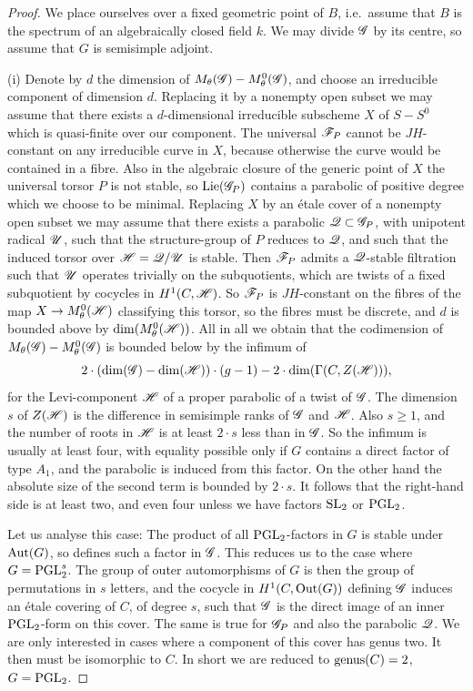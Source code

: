 \documentclass[12pt,english]{smfart}
\theoremstyle{plain} \newtheorem{innerthm}{Theorem} \newtheorem{innerlem}{Lemma} \newtheorem{innerprop}{Proposition} \newtheorem{innercor}{Corollary} \theoremstyle{definition} \newtheorem{innerdefn}{Definition} \newtheorem{innerconstr}{Construction} \theoremstyle{remark} \newtheorem*{remark}{Remark} \newtheorem*{remarks}{Remarks} \newtheorem*{applications}{Applications}
\begin{document}
\begin{proof}
We place ourselves over a fixed geometric point of $B$, i.e.\ assume that $B$ is the spectrum of an algebraically closed field $k$. We may divide $\mathscr{G}$ by its centre, so assume that $G$ is semisimple adjoint.

(i) Denote by $d$ the dimension of $M_\theta(\mathscr{G})-M_\theta^0(\mathscr{G})$, and choose an irreducible component of dimension $d$. Replacing it by a nonempty open subset we may assume that there exists a $d$-dimensional irreducible subscheme $X$ of $S-S^0$ which is quasi-finite over our component. The universal $\mathscr{F}_P$ cannot be $JH$-constant on any irreducible curve in $X$, because otherwise the curve would be contained in a fibre. Also in the algebraic closure of the generic point of $X$ the universal torsor $P$ is not stable,
so $\operatorname{Lie}(\mathscr{G}_P)$ contains a parabolic of positive degree which we choose to be minimal. Replacing $X$ by an \'etale cover of a nonempty open subset we may assume that there exists a parabolic $\mathscr{Q}\subset\mathscr{G}_P$, with unipotent radical $\mathscr{U}$, such that the structure-group of $P$ reduces to $\mathscr{Q}$, and such that the induced torsor over $\mathscr{H}=\mathscr{Q}/\mathscr{U}$ is stable. Then $\mathscr{F}_P$ admits a $\mathscr{Q}$-stable filtration such that $\mathscr{U}$ operates trivially on the subquotients, which are twists of a fixed subquotient by cocycles in $H^1(C,\mathscr{H})$. So $\mathscr{F}_P$ is $JH$-constant on the fibres of the map $X\to M_\theta^0(\mathscr{H})$ classifying this torsor, so the fibres must be discrete, and $d$ is bounded above by $\dim(M_\theta^0(\mathscr{H}))$. All in all we obtain that the codimension of $M_\theta(\mathscr{G})-M_\theta^0(\mathscr{G})$ is bounded below by the infimum of
\[
2\cdot(\dim(\mathscr{G})-\dim(\mathscr{H}))\cdot(g-1)-2\cdot\dim(\Gamma(C,Z(\mathscr{H}))),
\]
for the Levi-component $\mathscr{H}$ of a proper parabolic of a twist of $\mathscr{G}$. The dimension $s$ of $Z(\mathscr{H})$ is the difference in semisimple ranks of $\mathscr{G}$ and $\mathscr{H}$. Also $s\ge 1$, and the number of roots in $\mathscr{H}$ is at least $2\cdot s$ less than in $\mathscr{G}$. So the infimum is usually at least four, with equality possible only if $G$ contains a direct factor of type $A_1$, and the parabolic is induced from this factor. On the other hand the absolute size of the second term is bounded by $2\cdot s$. It follows that the right-hand side is at least two, and even four unless we have factors $\operatorname{SL}_2$ or $\operatorname{PGL}_2$.

Let us analyse this case: The product of all $\operatorname{PGL}_2$-factors in $G$ is stable under $\operatorname{Aut}(G)$, so defines such a factor in $\mathscr{G}$. This reduces us to the case where $G=\operatorname{PGL}_2^s$. The group of outer automorphisms of $G$ is then the group of permutations in $s$ letters, and the cocycle in $H^1(C,\operatorname{Out}(G))$ defining $\mathscr{G}$ induces an \'etale covering of $C$, of degree $s$, such that $\mathscr{G}$ is the direct image of an inner $\operatorname{PGL}_2$-form on this cover. The same is true for $\mathscr{G}_P$ and also the parabolic $\mathscr{Q}$. We are only interested in cases where a component of this cover has genus two. It then must be isomorphic to $C$. In short we are reduced to $\operatorname{genus}(C)=2$, $G=\operatorname{PGL}_2$.


\end{proof}
\end{document}

